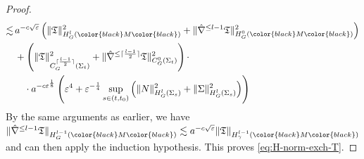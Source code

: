\documentclass[11pt,leqno,textwidth=10cm]{amsart}
\numberwithin{equation}{section}
\theoremstyle{definition}
\theoremstyle{plain}
\newcommand{\1}{\mathbbm{1}}
\renewcommand{\epsilon}{\varepsilon}
\newcommand{\nabhat}{\hat{\nabla}}
\newcommand{\change}[1]{\color{black}#1\color{black}}
\begin{document}
\begin{proof}
\begin{align*}
\lesssim&\,a^{-c\sqrt{\epsilon}}\left(\|\mathfrak{T}\|^2_{H^l_G(\change{M})}+\|\nabhat^{\leq l-1}\mathfrak{T}\|^2_{H^{0}_G(\change{M})}\right)\\
&\,+\left(\|\mathfrak{T}\|^2_{C^{\lceil\frac{l-1}2\rceil}_G(\Sigma_t)}+\|\nabhat^{\leq \lceil\frac{l-1}2\rceil}\mathfrak{T}\|^2_{C^{0}_G(\Sigma_t)}\right)\cdot \\
&\,\quad \cdot a^{-c\epsilon^\frac18}\left(\epsilon^4+\epsilon^{-\frac14}\sup_{s\in(t,t_0)}\left(\|N\|_{H^{l}_G(\Sigma_s)}^2+\|\Sigma\|_{H^{l}_G(\Sigma_s)}^2\right)\right)
\end{align*}
By the same arguments as earlier, we have $\|\nabhat^{\leq l-1}\mathfrak{T}\|_{H^{l-1}_G(\change{M})}\lesssim a^{-c\sqrt{\epsilon}}\|\mathfrak{T}\|_{H^{l-1}_\gamma(\change{M})}$ and can then apply the induction hypothesis. \change{This proves \eqref{eq:H-norm-exch-T}.}
\end{proof}
\end{document}
